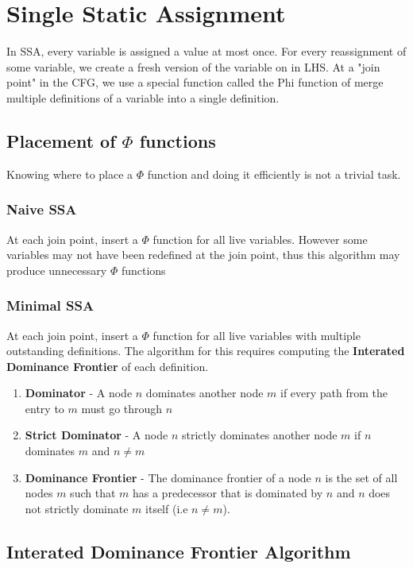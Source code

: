 \documentclass{article}
\begin{document}
\section*{Single Static Assignment}

In SSA, every variable is assigned a value at most once. For every reassignment
of some variable, we create a fresh version of the variable on in LHS. At a 
"join point" in the CFG, we use a special function called the Phi function of 
merge multiple definitions of a variable into a single definition.\\

\subsection*{Placement of \(\Phi\) functions}
Knowing where to place a \(\Phi\) function and doing it efficiently is not a
trivial task.

\subsubsection*{Naive SSA}
At each join point, insert a \(\Phi\) function for all live variables. However
some variables may not have been redefined at the join point, thus this algorithm
may produce unnecessary \(\Phi\) functions

\subsubsection*{Minimal SSA}
At each join point, insert a \(\Phi\) function for all live variables with
multiple outstanding definitions. The algorithm for this requires computing the
\textbf{Interated Dominance Frontier} of each definition.

\begin{enumerate}
    \item \textbf{Dominator} - A node \(n\) dominates another node \(m\) if
          every path from the entry to \(m\) must go through \(n\)
    \item \textbf{Strict Dominator} - A node \(n\) strictly dominates another
          node \(m\) if \(n\) dominates \(m\) and \(n \neq m\)
    \item \textbf{Dominance Frontier} - The dominance frontier of a node \(n\)
          is the set of all nodes \(m\) such that \(m\) has a predecessor that
          is dominated by \(n\) and \(n\) does not strictly dominate \(m\)
          itself (i.e \(n \neq m\)).
\end{enumerate}


\subsection*{Interated Dominance Frontier Algorithm}
\end{document}
